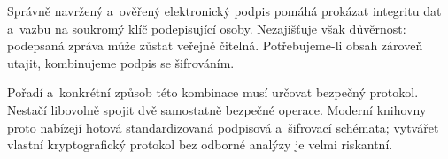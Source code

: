 Správně navržený a~ověřený elektronický podpis pomáhá prokázat integritu dat a~vazbu na soukromý klíč podepisující osoby. Nezajišťuje však důvěrnost: podepsaná zpráva může zůstat veřejně čitelná. Potřebujeme-li obsah zároveň utajit, kombinujeme podpis se šifrováním.

Pořadí a~konkrétní způsob této kombinace musí určovat bezpečný protokol. Nestačí libovolně spojit dvě samostatně bezpečné operace. Moderní knihovny proto nabízejí hotová standardizovaná podpisová a~šifrovací schémata; vytvářet vlastní kryptografický protokol bez odborné analýzy je velmi riskantní.

